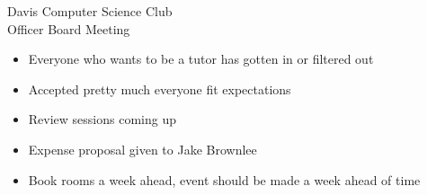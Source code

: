 \documentclass{article}
\begin{document}
\begin{Minutes}{Davis Computer Science Club\\Officer Board Meeting}
\begin{itemize}
	\item Everyone who wants to be a tutor has gotten in or filtered out
	\item Accepted pretty much everyone fit expectations
	\item Review sessions coming up
\end {itemize}

\begin {itemize}
    \item Expense proposal given to Jake Brownlee
\end {itemize}

\begin {itemize}
    \item Book rooms a week ahead, event should be made a week ahead of time
\end {itemize}

\end{Minutes}
\thispagestyle{creditfooter}
\end{document}
